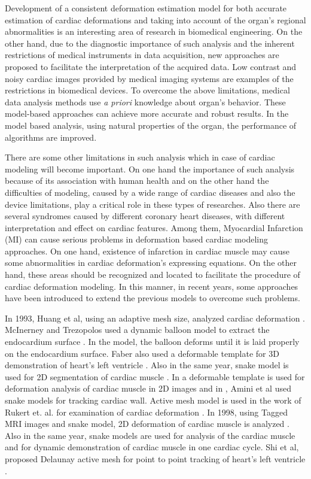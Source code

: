 \documentclass{jicspack}
\begin{document}
Development of a consistent deformation estimation model for both accurate estimation
of cardiac deformations and taking into account of the organ's regional abnormalities is an interesting area of research in biomedical engineering. On the other hand, due to the diagnostic importance of such analysis and the inherent restrictions of medical instruments in data acquisition, new approaches are proposed to facilitate the interpretation of the acquired data. Low contrast and noisy cardiac images provided by medical imaging systems are examples of the restrictions in biomedical devices. To overcome the above limitations,
medical data analysis methods use \textit{a priori} knowledge about organ's behavior. These model-based approaches can achieve more accurate and robust results. In the model based analysis, using natural properties of the organ, the performance of algorithms are improved.

There are some other limitations in such analysis which in case of cardiac modeling
will become important. On one hand the importance of such analysis because of its
association with human health and on the other hand the difficulties of modeling, caused by
a wide range of cardiac diseases and also the device limitations, play a critical role in these types of researches. Also there are several syndromes caused by different coronary heart diseases, with different interpretation and effect on cardiac features. Among them, Myocardial Infarction (MI) can cause serious problems in deformation
based cardiac modeling approaches. On one hand, existence of infarction in cardiac
muscle may cause some abnormalities in cardiac deformation's expressing equations. On
the other hand, these areas should be recognized and located to facilitate the procedure of
cardiac deformation modeling. In this manner, in recent years, some approaches have been
introduced to extend the previous models to overcome such problems. 

In 1993, Huang et al, using an adaptive mesh size, analyzed cardiac deformation \cite{1}.
McInerney and Trezopolos used a dynamic balloon model to extract the endocardium
surface \cite{2}. In the model, the balloon deforms until it is laid properly on the endocardium
surface. Faber also used a deformable template for 3D demonstration of heart's left
ventricle \cite{3}. Also in the same year, snake model is used for 2D segmentation of cardiac
muscle \cite{4}. In \cite{5} a deformable template is used for deformation analysis of cardiac muscle in
2D images and in \cite{6}, Amini et al used snake models for tracking cardiac wall. Active mesh
model is used in the work of Rukert et. al. for examination of cardiac deformation \cite{7}. In 1998,
using Tagged MRI images and snake model, 2D deformation of cardiac muscle is analyzed
\cite{8}. Also in the same year, snake models are used for analysis of the cardiac
muscle \cite{9} and for dynamic demonstration of cardiac muscle in one cardiac cycle. Shi et al, proposed Delaunay active mesh for point to point tracking of
heart's left ventricle \cite{10}.
\end{document}
